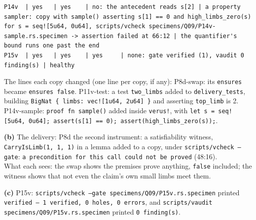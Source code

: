 \documentclass[11pt]{article}
\begin{document}
\begin{answer}
\begin{lstlisting}[basicstyle=\ttfamily\scriptsize,breaklines=true,columns=fullflexible]
P14v  | yes   | yes    | no: the antecedent reads s[2] | a property sampler: copy with sample() asserting s[1] == 0 and high_limbs_zero(s) for s = seq![5u64, 0u64], scripts/vcheck specimens/Q09/P14v-sample.rs.specimen -> assertion failed at 66:12 | the quantifier's bound runs one past the end
P15v  | yes   | yes    | yes     | none: gate verified (1), vaudit 0 finding(s) | healthy
\end{lstlisting}
The lines each copy changed (one line per copy, if any): P8d-swap: its
\texttt{ensures} became \texttt{ensures false}. P11v-test: a test
\texttt{two\_limbs} added to \texttt{delivery\_tests}, building
\texttt{BigNat \{ limbs: vec![1u64, 2u64] \}} and asserting \texttt{top\_limb} is
2. P14v-sample: \texttt{proof fn sample()} added inside \texttt{verus!}, with
\texttt{let s = seq![5u64, 0u64]; assert(s[1] == 0); assert(high\_limbs\_zero(s));}.

\textbf{(b)} The delivery: P8d \quad the second instrument: a satisfiability
witness, \texttt{CarryIsLimb(1, 1, 1)} in a lemma added to a copy, under
\texttt{scripts/vcheck --gate}: \texttt{a precondition for this call could not
be proved} (48:16). \\
What each sees: the swap shows the premises prove anything, \texttt{false}
included; the witness shows that not even the claim's own small limbs meet
them.

\textbf{(c)} P15v: \texttt{scripts/vcheck --gate specimens/Q09/P15v.rs.specimen}
printed \texttt{verified --- 1 verified, 0 holes, 0 errors}, and
\texttt{scripts/vaudit specimens/Q09/P15v.rs.specimen} printed \texttt{0
finding(s)}.
\end{answer}

\end{document}
